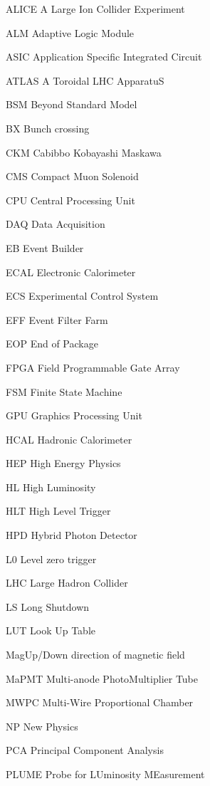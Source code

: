 \begin{abbreviations}
    \item[ALICE] A Large Ion Collider Experiment
    \item[ALM] Adaptive Logic Module
    \item[ASIC] Application Specific Integrated Circuit
    \item[ATLAS] A Toroidal LHC ApparatuS
    \item[BSM] Beyond Standard Model
    \item[BX] Bunch crossing
    \item[CKM] Cabibbo Kobayashi Maskawa
    \item[CMS] Compact Muon Solenoid
    \item[CPU] Central Processing Unit
    \item[DAQ] Data Acquisition
    \item[EB] Event Builder
    \item[ECAL] Electronic Calorimeter
    \item[ECS] Experimental Control System
    \item[EFF] Event Filter Farm
    \item[EOP] End of Package
    \item[FPGA] Field Programmable Gate Array
    \item[FSM] Finite State Machine
    \item[GPU] Graphics Processing Unit
    \item[HCAL] Hadronic Calorimeter
    \item[HEP] High Energy Physics
    \item[HL] High Luminosity
    \item[HLT] High Level Trigger
    \item[HPD] Hybrid Photon Detector
    \item[L$0$] Level zero trigger
    \item[LHC] Large Hadron Collider
    \item[LS] Long Shutdown
    \item[LUT] Look Up Table
    \item[MagUp/Down] direction of magnetic field
    \item[MaPMT] Multi-anode PhotoMultiplier Tube
    \item[MWPC] Multi-Wire Proportional Chamber
    \item[NP] New Physics
    \item[PCA] Principal Component Analysis
    \item[PLUME] Probe for LUminosity MEasurement

\end{abbreviations}
